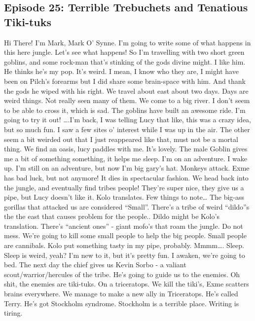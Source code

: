 \subsection{Episode 25: Terrible Trebuchets and Tenatious Tiki-tuks}
Hi There!\medskip
I’m Mark, Mark O’ Synne.\medskip
I’m going to write some of what happens in this here jungle. Let’s see what happens!\medskip
So I’m travelling with two short green goblins, and some rock-man that’s stinking of the gods divine might. I like him. He thinks he’s my pop. It’s weird.\medskip
I mean, I know who they are, I might have been on Pilch’s forearms but I did share some brain-space with him. And thank the gods he wiped with his right.\medskip
We travel about east about two days. Days are weird things. Not really seen many of them.\medskip
We come to a big river. I don’t seem to be able to cross it, which is sad.\medskip
The goblins have built an awesome ride. I’m going to try it out!\medskip
….I’m back, I was telling Lucy that like, this was a crazy idea, but so much fun. I saw a few sites o’ interest while I was up in the air.\medskip
The other seem a bit weirded out that I just reappeared like that, must not be a mortal thing.\medskip
We find an oasis, lucy paddles with me. It’s lovely. The male Goblin gives me a bit of something something, it helps me sleep. I’m on an adventure. I wake up. I’m still on an adventure, but now I’m big gary’s hat.\medskip
Monkeys attack. Exme has bad luck, but not anymore! It dies in spectacular fashion.\medskip
We head back into the jungle, and eventually find tribes people!\medskip
They’re super nice, they give us a pipe, but Lucy doesn’t like it.\medskip
Kolo translates.\medskip
Few things to note…\medskip
The big-ass gorillas that attacked us are considered “Small”.\medskip
There’s a tribe of weird “dildo”s the the east that causes problem for the people.. Dildo might be Kolo’s translation.\medskip
There’s “ancient ones” - giant mofo’s that roam the jungle. Do not mess.\medskip
We’re going to kill some small people to help the big people. Small people are cannibals.\medskip
Kolo put something tasty in my pipe, probably. Mmmm….\medskip
Sleep.\medskip
Sleep is weird, yeah? I’m new to it, but it’s pretty fun.\medskip
I awaken, we’re going to bed.\medskip
The next day the chief gives us Kevin Sorbo - a valiant scout/warrior/hercules of the tribe. He’s going to guide us to the enemies.\medskip
Oh shit, the enemies are tiki-tuks. On a triceratops.\medskip
We kill the tiki’s, Exme scatters brains everywhere. We manage to make a new ally in Triceratops.\medskip
He’s called Terry.\medskip
He’s got Stockholm syndrome.\medskip
Stockholm is a terrible place.\medskip
Writing is tiring.\medskip

